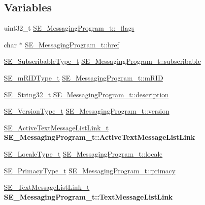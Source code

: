 \subsection*{Variables}
\begin{DoxyCompactItemize}
\item 
uint32\+\_\+t \hyperlink{group__MessagingProgram_ga42f850441cf2c04e986da12014095d29}{S\+E\+\_\+\+Messaging\+Program\+\_\+t\+::\+\_\+flags}
\item 
char $\ast$ \hyperlink{group__MessagingProgram_ga1eb751e532e2b3d1a8ddabe4a2d010f8}{S\+E\+\_\+\+Messaging\+Program\+\_\+t\+::href}
\item 
\hyperlink{group__SubscribableType_ga5c41f553d369710ed34619266bf2551e}{S\+E\+\_\+\+Subscribable\+Type\+\_\+t} \hyperlink{group__MessagingProgram_ga00670f1887e83efd074cb1c3431b1723}{S\+E\+\_\+\+Messaging\+Program\+\_\+t\+::subscribable}
\item 
\hyperlink{group__mRIDType_gac74622112f3a388a2851b2289963ba5e}{S\+E\+\_\+m\+R\+I\+D\+Type\+\_\+t} \hyperlink{group__MessagingProgram_ga76dee6cf9af1a2113b116d4eb87805bb}{S\+E\+\_\+\+Messaging\+Program\+\_\+t\+::m\+R\+ID}
\item 
\hyperlink{group__String32_gac9f59b06b168b4d2e0d45ed41699af42}{S\+E\+\_\+\+String32\+\_\+t} \hyperlink{group__MessagingProgram_gaac179189b467239471e30bb4fc54ed82}{S\+E\+\_\+\+Messaging\+Program\+\_\+t\+::description}
\item 
\hyperlink{group__VersionType_ga4b8d27838226948397ed99f67d46e2ae}{S\+E\+\_\+\+Version\+Type\+\_\+t} \hyperlink{group__MessagingProgram_ga63c952695fdbc82efa3253c42745a7f8}{S\+E\+\_\+\+Messaging\+Program\+\_\+t\+::version}
\item 
\mbox{\label{group__MessagingProgram_ga66f1bd6b594e84be75a0c2715f5203d5}} 
\hyperlink{structSE__ActiveTextMessageListLink__t}{S\+E\+\_\+\+Active\+Text\+Message\+List\+Link\+\_\+t} {\bfseries S\+E\+\_\+\+Messaging\+Program\+\_\+t\+::\+Active\+Text\+Message\+List\+Link}
\item 
\hyperlink{group__LocaleType_gafbd2b639ff2cebd36ad75759203ee20c}{S\+E\+\_\+\+Locale\+Type\+\_\+t} \hyperlink{group__MessagingProgram_ga57da8d224c245d4abf36172470de4c00}{S\+E\+\_\+\+Messaging\+Program\+\_\+t\+::locale}
\item 
\hyperlink{group__PrimacyType_ga484b22ef8ff92c8801e6a8b7bd8351eb}{S\+E\+\_\+\+Primacy\+Type\+\_\+t} \hyperlink{group__MessagingProgram_ga5923a2dd14be22f05ec8b33c73a4676e}{S\+E\+\_\+\+Messaging\+Program\+\_\+t\+::primacy}
\item 
\mbox{\label{group__MessagingProgram_ga840889a992f857ad03f6f07ccaa38f76}} 
\hyperlink{structSE__TextMessageListLink__t}{S\+E\+\_\+\+Text\+Message\+List\+Link\+\_\+t} {\bfseries S\+E\+\_\+\+Messaging\+Program\+\_\+t\+::\+Text\+Message\+List\+Link}
\end{DoxyCompactItemize}


